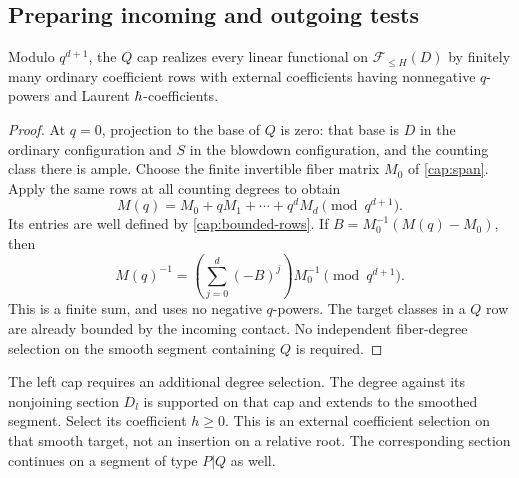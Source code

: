 \subsection{Preparing incoming and outgoing tests}

\begin{lemma}\label{cap:Q}
Modulo $q^{d+1}$, the $Q$ cap realizes every linear functional on
$\mathcal F_{\leq H}(D)$ by finitely many ordinary coefficient rows
with external coefficients having nonnegative $q$-powers and Laurent
$\hbar$-coefficients.
\end{lemma}
\begin{proof}
At $q=0$, projection to the base of $Q$ is zero: that base is $D$ in
the ordinary configuration and $S$ in the blowdown configuration,
and the counting class there is ample.  Choose the finite invertible
fiber matrix $M_0$ of \cref{cap:span}.  Apply the same rows at all
counting degrees to obtain
\[
       M(q)=M_0+qM_1+\cdots+q^d M_d
                 \pmod{q^{d+1}}.
\]
Its entries are well defined by \cref{cap:bounded-rows}.  If
$B=M_0^{-1}(M(q)-M_0)$, then
\begin{equation}\label{cap:Qinverse}
 M(q)^{-1}=\left(\sum_{j=0}^{d}(-B)^j\right)M_0^{-1}
                  \pmod{q^{d+1}}.
\end{equation}
This is a finite sum, and uses no negative $q$-powers.
The target classes in a $Q$ row are already bounded by the incoming
contact.  No independent fiber-degree selection on the smooth
segment containing $Q$ is required.
\end{proof}

The left cap requires an additional degree selection.  The degree against
its nonjoining section $D_l$ is supported on that cap and extends to the
smoothed segment.  Select its coefficient $h\geq0$.  This is an external
coefficient selection on that smooth target, not an insertion on a
relative root.  The corresponding section continues on a segment of
type $P|Q$ as well.

